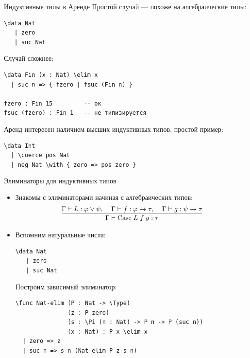 \documentclass[aspectratio=169]{beamer}
\begin{document}

\begin{frame}[fragile]{Индуктивные типы в Аренде}
Простой случай --- похоже на алгебраические типы:
\small\color[HTML]{025002}\begin{verbatim}
\data Nat 
   | zero
   | suc Nat
\end{verbatim}\normalsize
\color{black}

Случай сложнее:
\small\color[HTML]{025002}\begin{verbatim}
\data Fin (x : Nat) \elim x
  | suc n => { fzero | fsuc (Fin n) }

fzero : Fin 15         -- ок
fsuc (fzero) : Fin 1   -- не типизируется
\end{verbatim}
\color{black}


Аренд интересен наличием высших индуктивных типов, простой пример:

\small\color[HTML]{025002}\begin{verbatim}
\data Int
  | \coerce pos Nat
  | neg Nat \with { zero => pos zero }
\end{verbatim}\normalsize
\color{black}

\end{frame}

\begin{frame}[fragile]{Элиминаторы для индуктивных типов}
\begin{itemize}
\item Знакомы с элиминаторами начиная с алгебраических типов:
$$\infer{\Gamma \vdash \text{Case} \; L \; f \; g : \tau}{\Gamma \vdash L: \varphi \vee \psi, \;\;\;\; \Gamma \vdash f : \varphi \to \tau, \;\;\;\; \Gamma \vdash g: \psi \to \tau}$$

\item Вспомним натуральные числа:

\small\color[HTML]{025002}\begin{verbatim}
\data Nat 
   | zero
   | suc Nat
\end{verbatim}\normalsize
\color{black}

Построим зависимый элиминатор:

\small\color[HTML]{025002}\begin{verbatim}
\func Nat-elim (P : Nat -> \Type)
               (z : P zero)
               (s : \Pi (n : Nat) -> P n -> P (suc n))
               (x : Nat) : P x \elim x
  | zero => z
  | suc n => s n (Nat-elim P z s n)
\end{verbatim}\normalsize
\color{black}

\end{itemize}
\end{frame}
\end{document}
